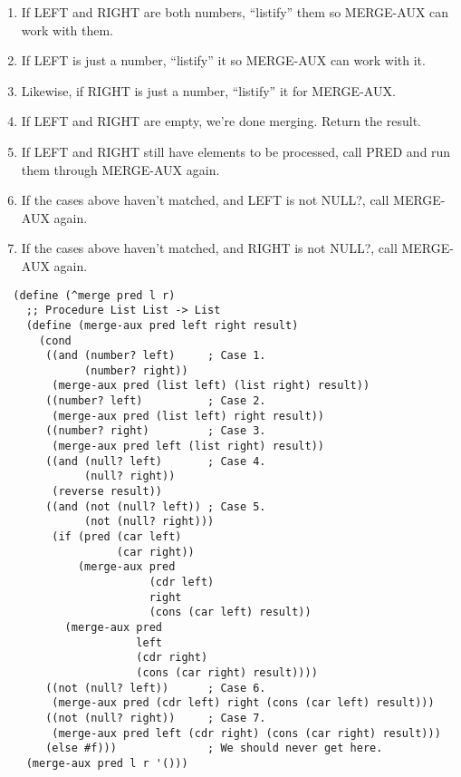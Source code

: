 \documentclass[12pt,openright,draft]{book}
\begin{document}
\begin{enumerate}

\item If LEFT and RIGHT are both numbers, ``listify'' them so
  MERGE-AUX can work with them.

\item If LEFT is just a number, ``listify'' it so MERGE-AUX can work with
  it.

\item Likewise, if RIGHT is just a number, ``listify'' it for
  MERGE-AUX.

\item If LEFT and RIGHT are empty, we're done merging. Return the
  result.

\item If LEFT and RIGHT still have elements to be processed, call PRED
  and run them through MERGE-AUX again.

\item If the cases above haven't matched, and LEFT is not NULL?, call
  MERGE-AUX again.

\item If the cases above haven't matched, and RIGHT is not NULL?, call
  MERGE-AUX again.

\end{enumerate}

\begin{verbatim}
  (define (^merge pred l r)
    ;; Procedure List List -> List
    (define (merge-aux pred left right result)
      (cond
       ((and (number? left)     ; Case 1.
             (number? right))
        (merge-aux pred (list left) (list right) result))
       ((number? left)          ; Case 2.
        (merge-aux pred (list left) right result))
       ((number? right)         ; Case 3.
        (merge-aux pred left (list right) result))
       ((and (null? left)       ; Case 4.
             (null? right))
        (reverse result))
       ((and (not (null? left)) ; Case 5.
             (not (null? right)))
        (if (pred (car left)
                  (car right))
            (merge-aux pred
                       (cdr left)
                       right
                       (cons (car left) result))
          (merge-aux pred
                     left
                     (cdr right)
                     (cons (car right) result))))
       ((not (null? left))      ; Case 6.
        (merge-aux pred (cdr left) right (cons (car left) result)))
       ((not (null? right))     ; Case 7.
        (merge-aux pred left (cdr right) (cons (car right) result)))
       (else #f)))              ; We should never get here.
    (merge-aux pred l r '()))
\end{verbatim}
\end{document}
